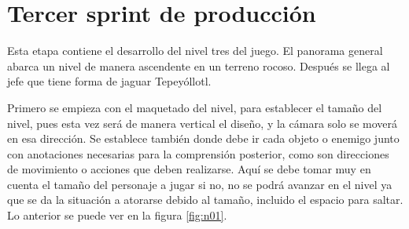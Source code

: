 
\section{Tercer sprint de producción}
Esta etapa contiene el desarrollo del nivel tres del juego. El panorama general abarca un nivel de manera ascendente en un terreno rocoso. Después se llega al jefe que tiene forma de jaguar Tepeyóllotl.

Primero se empieza con el maquetado del nivel, para establecer el tamaño del nivel, pues esta vez será de manera vertical el diseño, y la cámara solo se moverá en esa dirección. Se establece también donde debe ir cada objeto o enemigo junto con anotaciones necesarias para la comprensión posterior, como son direcciones de movimiento o acciones que deben realizarse. Aquí se debe tomar muy en cuenta el tamaño del personaje a jugar si no, no se podrá avanzar en el nivel ya que se da la situación a atorarse debido al tamaño, incluido el espacio para saltar. Lo anterior se puede ver en la figura \ref{fig:n01}.
